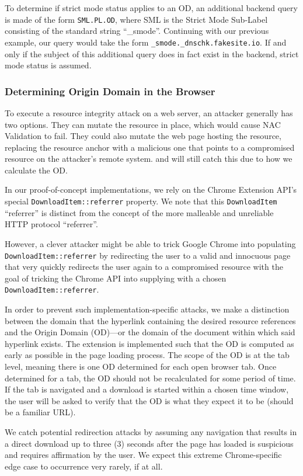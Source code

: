 To determine if strict mode status applies to an OD, an additional backend query
is made of the form \texttt{SML.PL.OD}, where SML is the Strict Mode Sub-Label
consisting of the standard string ``\_smode''. Continuing with our previous
example, our query would take the form \texttt{\_smode.\_dnschk.fakesite.io}. If
and only if the subject of this additional query does in fact exist in the
backend, strict mode status is assumed.

\subsubsection{Determining Origin Domain in the Browser}

To execute a resource integrity attack on a web server, an attacker generally
has two options. They can mutate the resource in place, which would cause NAC
Validation to fail. They could also mutate the web page hosting the resource,
replacing the resource anchor with a malicious one that points to a compromised
resource on the attacker's remote system. \DNSSYS{} and \DHTSYS{} will still
catch this due to how we calculate the OD.

In our proof-of-concept implementations, we rely on the Chrome Extension API's
special \texttt{DownloadItem::referrer} property. We note that this
\texttt{DownloadItem} ``referrer'' is distinct from the concept of the more
malleable and unreliable HTTP protocol ``referrer''.

However, a clever attacker might be able to trick Google Chrome into populating
\texttt{DownloadItem::referrer} by redirecting the user to a valid and innocuous
page that very quickly redirects the user again to a compromised resource with
the goal of tricking the Chrome API into supplying \SYSTEM{} with a chosen
\texttt{DownloadItem::referrer}.

In order to prevent such implementation-specific attacks, we make a distinction
between the domain that the hyperlink containing the desired resource references
and the Origin Domain (OD)---or the domain of the document within which said
hyperlink exists. The extension is implemented such that the OD is computed as
early as possible in the page loading process. The scope of the OD is at the tab
level, meaning there is one OD determined for each open browser tab. Once
determined for a tab, the OD should not be recalculated for some period of time.
If the tab is navigated and a download is started within a chosen time window,
the user will be asked to verify that the OD is what they expect it to be
(should be a familiar URL).

We catch potential redirection attacks by assuming any navigation that results
in a direct download up to three (3) seconds after the page has loaded is
suspicious and requires affirmation by the user. We expect this extreme
Chrome-specific edge case to occurrence very rarely, if at all.
